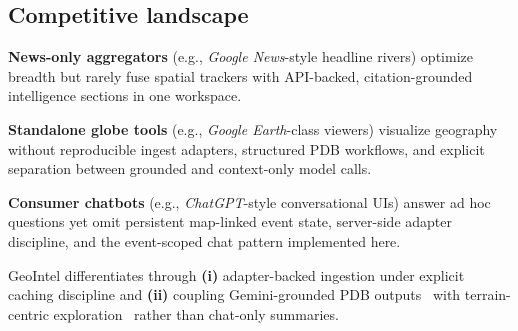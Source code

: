 \subsection{Competitive landscape}

\textbf{News-only aggregators} (e.g., \emph{Google News}-style headline rivers) optimize breadth but rarely fuse spatial trackers with API-backed, citation-grounded intelligence sections in one workspace.

\textbf{Standalone globe tools} (e.g., \emph{Google Earth}-class viewers) visualize geography without reproducible ingest adapters, structured PDB workflows, and explicit separation between grounded and context-only model calls.

\textbf{Consumer chatbots} (e.g., \emph{ChatGPT}-style conversational UIs) answer ad hoc questions yet omit persistent map-linked event state, server-side adapter discipline, and the event-scoped chat pattern implemented here.

GeoIntel differentiates through \textbf{(i)} adapter-backed ingestion under explicit caching discipline and \textbf{(ii)} coupling Gemini-grounded PDB outputs~\cite{gemini-api} with terrain-centric exploration~\cite{cesium} rather than chat-only summaries.

